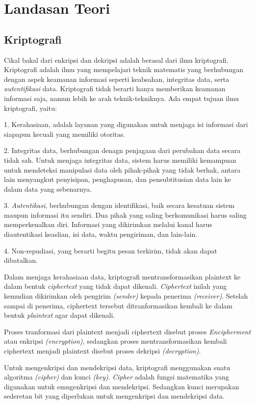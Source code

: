\documentclass{jtetiproposalskripsi}
\begin{document}
\section{Landasan Teori}
\subsection{Kriptografi}
Cikal bakal dari enkripsi dan dekripsi adalah berasal dari ilmu kriptografi. Kriptografi adalah ilmu yang mempelajari teknik matematis yang berhubungan dengan aspek keamanan informasi seperti keabsahan, integritas data, serta \emph{autentifikasi} data. Kriptografi tidak berarti hanya memberikan keamanan informasi saja, namun lebih ke arah teknik-tekniknya. Ada empat tujuan ilmu kriptografi, yaitu:

1.	Kerahasiaan, adalah layanan yang digunakan untuk menjaga isi informasi dari siapapun kecuali yang memiliki otoritas.

2.	Integritas data, berhubungan denagn penjagaan dari perubahan data secara tidak sah. Untuk menjaga integritas data, sistem harus memiliki kemampuan untuk mendeteksi manipulasi data oleh pihak-pihak yang tidak berhak, antara lain menyangkut penyisipan, penghapusan, dan pensubtitusian data lain ke dalam data yang sebenarnya.

3.	\emph{Autentikasi}, berhubungan dengan identifikasi, baik secara kesatuan sistem maupun informasi itu sendiri. Dua pihak yang saling berkomunikasi harus saling memperkenalkan diri. Informasi yang dikirimkan melalui kanal harus diautentikasi keaslian, isi data, waktu pengiriman, dan lain-lain.

4.	Non-repudiasi, yang berarti begitu pesan terkirim, tidak akan dapat dibatalkan.

Dalam menjaga kerahasiaan data, kriptografi mentransformasikan plaintext ke dalam bentuk \emph{ciphertext} yang tidak dapat dikenali. \emph{Ciphertext} inilah yang kemudian dikirimkan oleh pengirim \emph{(sender)} kepada penerima \emph{(receiver)}. Setelah sampai di penerima, ciphertext tersebut ditranformasikan kembali ke dalam bentuk \emph{plaintext} agar dapat dikenali.

Proses tranformasi dari plaintext menjadi ciphertext disebut proses \emph{Encipherment} atau enkripsi \emph{(encryption)}, sedangkan proses mentransformasikan kembali ciphertext menjadi plaintext disebut proses dekripsi \emph{(decryption)}.

Untuk mengenkripsi dan mendekripsi data, kriptografi menggunakan suatu algoritma \emph{(cipher)} dan kunci \emph{(key)}. \emph{Cipher} adalah fungsi matematika yang digunakan untuk emngenkripsi dan mendekripsi. Sedangkan kunci merupakan sederetan bit yang diperlukan untuk mengenkripsi dan mendekripsi data.
\end{document}
